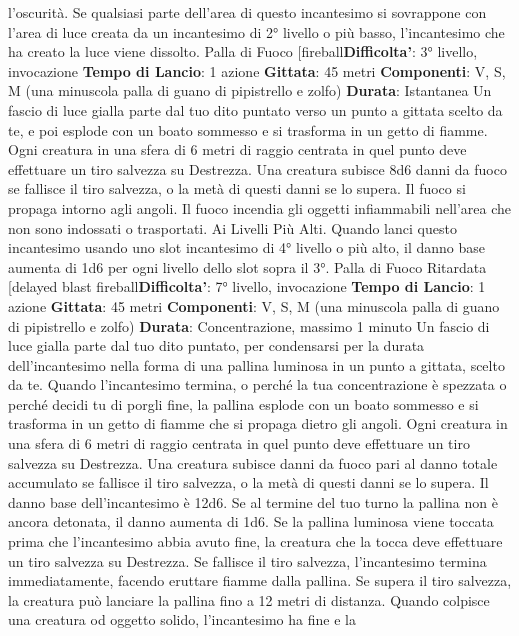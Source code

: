 \begin{multicols}{2}
l’oscurità.
Se qualsiasi parte dell’area di questo incantesimo si
sovrappone con l’area di luce creata da un incantesimo
di 2° livello o più basso, l’incantesimo che ha creato la
luce viene dissolto.
Palla di Fuoco
[fireball\textbf{Difficolta'}:
3° livello, invocazione
\textbf{Tempo di Lancio}: 1 azione
\textbf{Gittata}: 45 metri
\textbf{Componenti}: V, S, M (una minuscola palla di guano di
pipistrello e zolfo)
\textbf{Durata}: Istantanea
Un fascio di luce gialla parte dal tuo dito puntato verso
un punto a gittata scelto da te, e poi esplode con un
boato sommesso e si trasforma in un getto di fiamme.
Ogni creatura in una sfera di 6 metri di raggio centrata
in quel punto deve effettuare un tiro salvezza su
Destrezza. Una creatura subisce 8d6 danni da fuoco se
fallisce il tiro salvezza, o la metà di questi danni se lo
supera.
Il fuoco si propaga intorno agli angoli. Il fuoco incendia
gli oggetti infiammabili nell’area che non sono indossati
o trasportati.
Ai Livelli Più Alti. Quando lanci questo incantesimo
usando uno slot incantesimo di 4° livello o più alto, il
danno base aumenta di 1d6 per ogni livello dello slot
sopra il 3°.
Palla di Fuoco Ritardata
[delayed blast fireball\textbf{Difficolta'}:
7° livello, invocazione
\textbf{Tempo di Lancio}: 1 azione
\textbf{Gittata}: 45 metri
\textbf{Componenti}: V, S, M (una minuscola palla di guano di
pipistrello e zolfo)
\textbf{Durata}: Concentrazione, massimo 1 minuto
Un fascio di luce gialla parte dal tuo dito puntato, per
condensarsi per la durata dell’incantesimo nella forma
di una pallina luminosa in un punto a gittata, scelto da
te. Quando l’incantesimo termina, o perché la tua
concentrazione è spezzata o perché decidi tu di porgli
fine, la pallina esplode con un boato sommesso e si
trasforma in un getto di fiamme che si propaga dietro gli
angoli. Ogni creatura in una sfera di 6 metri di raggio
centrata in quel punto deve effettuare un tiro salvezza
su Destrezza. Una creatura subisce danni da fuoco pari
al danno totale accumulato se fallisce il tiro salvezza, o
la metà di questi danni se lo supera.
Il danno base dell’incantesimo è 12d6. Se al termine del
tuo turno la pallina non è ancora detonata, il danno
aumenta di 1d6.
Se la pallina luminosa viene toccata prima che
l’incantesimo abbia avuto fine, la creatura che la tocca
deve effettuare un tiro salvezza su Destrezza. Se
fallisce il tiro salvezza, l’incantesimo termina
immediatamente, facendo eruttare fiamme dalla pallina.
Se supera il tiro salvezza, la creatura può lanciare la
pallina fino a 12 metri di distanza. Quando colpisce una
creatura od oggetto solido, l’incantesimo ha fine e la

\end{multicols}
